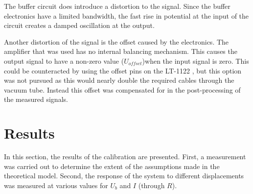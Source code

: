 The buffer circuit does introduce a distortion to the signal. Since the buffer electronics have a limited bandwidth, the fast rise in potential at the input of the circuit creates a damped oscillation at the output.

Another distortion of the signal is the offset caused by the electronics. The amplifier that was used has no internal balancing mechanism. This causes the output signal to have a non-zero value ($U_{offset}$)when the input signal is zero. This could be counteracted by using the offset pins on the LT-1122 \cite{LT1122}, but this option was not pursued as this would nearly double the required cables through the vacuum tube. Instead this offset was compensated for in the post-processing of the measured signals.

%


\section{Results}
In this section, the results of the calibration are presented. First, a measurement was carried out to determine the extent of the assumptions made in the theoretical model. Second, the response of the system to different displacements was measured at various values for $U_b$ and $I$ (through $R$).

